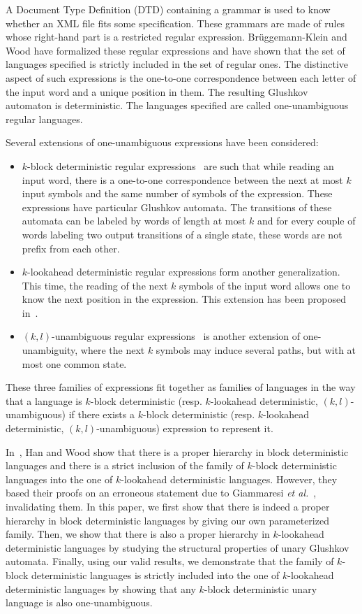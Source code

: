 \documentclass{llncs}
\begin{document}
	A Document Type Definition (DTD) containing a grammar is used to know whether an XML file fits some specification. These grammars are made of rules whose right-hand part is a restricted regular expression.
	Brüggemann-Klein and Wood have formalized these regular expressions and have shown that the set of languages specified is strictly included in the set of regular ones.
	The distinctive aspect of such expressions is the one-to-one correspondence between each letter of the input word and a unique position in them.
	The resulting Glushkov automaton is deterministic.
	The languages specified are called one-unambiguous regular languages.

	Several extensions of one-unambiguous expressions have been considered:
\begin{itemize}
	\item $k$-block deterministic regular expressions~\cite{GMW01} are such that while reading an input word, there is a one-to-one correspondence between the next at most $k$ input symbols and the same number of symbols of the expression.
These expressions have particular Glushkov automata.
The transitions of these automata can be labeled by words of length at most $k$ and for every couple of words labeling two output transitions of a single state, these words are not prefix from each other. 
	\item $k$-lookahead deterministic regular expressions form another generalization.
This time, the reading of the next $k$ symbols of the input word allows one to know the next position in the expression. 
This extension has been proposed in~\cite{HW08}. 
  \item $(k,l)$-unambiguous regular expressions~\cite{CFM14} is another extension of one-unam\-bi\-guity, where the next $k$ symbols may induce several paths, but with at most one common state.
\end{itemize}

	These three families of expressions fit together as families of languages in the way that a language is $k$-block deterministic (resp. $k$-lookahead deterministic, $(k,l)$-unambiguous) if there exists a $k$-block deterministic (resp. $k$-lookahead deterministic, $(k,l)$-unambiguous) expression to represent it. 

	In~\cite{HW08}, Han and Wood show that there is a proper hierarchy in block deterministic languages and there is a strict inclusion of the family of $k$-block deterministic languages into the one of $k$-lookahead deterministic languages.
	However, they based their proofs on an erroneous statement due to Giammaresi \emph{et al.}~\cite{GMW01}, invalidating them.
	In this paper, we first show that there is indeed a proper hierarchy in block deterministic languages by giving our own parameterized family.
	Then, we show that there is also a proper hierarchy in $k$-lookahead deterministic languages by studying the structural properties of unary Glushkov automata.
	Finally, using our valid results, we demonstrate that the family of $k$-block deterministic languages is strictly included into the one of $k$-lookahead deterministic languages by showing that any $k$-block deterministic unary language is also one-unambiguous.
\end{document}

